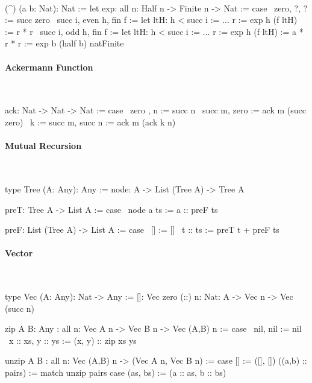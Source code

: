 \ \begin{alba}
    (^) (a b: Nat): Nat :=
        let
            exp: all n: Half n -> Finite n -> Nat := case
                \ zero, ?, ? :=
                    succ zero
                \ succ i, even h, fin f :=
                    let
                        ltH: h < succ i := ...
                        r := exp h (f ltH)
                    :=
                        r * r
                \ succ i, odd h, fin f :=
                    let
                        ltH: h < succ i := ...
                        r := exp h (f ltH)
                    :=
                        a * r * r
        :=
            exp b (half b) natFinite
\end{alba}




\paragraph{Ackermann Function}

\ \begin{alba}
    ack: Nat -> Nat -> Nat := case
        \ zero  ,      n      :=  succ n
        \ succ m,      zero   :=  ack m (succ zero)
        \ k := succ m, succ n :=  ack m (ack k n)
\end{alba}









\paragraph{Mutual Recursion}

\ \begin{alba}
    type Tree (A: Any): Any :=
        node: A -> List (Tree A) -> Tree A

    preT: Tree A -> List A := case
        \ node a ts := a :: preF ts

    preF: List (Tree A) -> List A := case
        \ []         :=  []
        \ t :: ts    :=  preT t + preF ts
\end{alba}






\paragraph{Vector}

\ \begin{alba}
    type Vec (A: Any): Nat -> Any :=
        []:  Vec zero
        (::) {n: Nat}: A -> Vec n -> Vec (succ n)

    zip {A B: Any}
    : all {n}: Vec A n -> Vec B n -> Vec (A,B) n
    := case
        \ nil,     nil     := nil
        \ x :: xs, y :: ys := (x, y) :: zip xs ys


    unzip {A B}
    : all {n}: Vec (A,B) n -> (Vec A n, Vec B n)
    := case
        [] :=
            ([], [])
        ((a,b) :: pairs) :=
            match unzip pairs case
                (as, bs) :=
                    (a :: as, b :: bs)
\end{alba}

